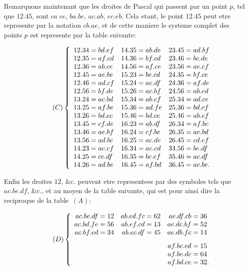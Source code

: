 \documentclass[11pt,a4paper]{book}
\begin{document}
\newpage
\setcounter{page}{552}

Remarquons maintenant que les droites de Pascal qui passent par un point $p$, tel que $12.45$, sont $ca\;ce$, $ba.be$, $ac.ab$, $ec.eb$. Cela etant, le point $12.45$ peut etre represente par la notation $cb.ae$, et de cette maniere le systeme complet des points $p$ est represente par la table suivante:

\begin{equation}
\tag{$C$}
\left\{
\begin{array}{r@{\;=\;}l r@{\;=\;}l r@{\;=\;}l}
12.34 & bd.ef & 14.35 & ab.de & 23.45 & ad.bf \\
12.35 & af.cd & 14.36 & bf.cd & 23.46 & bc.de \\
12.36 & ab.ce & 14.56 & af.ce & 23.56 & ae.cf \\
12.45 & ae.be & 15.23 & be.cd & 24.35 & bf.ce \\
12.46 & ad.cf & 15.24 & ae.df & 24.36 & af.de \\
12.56 & bf.de & 15.26 & ac.bf & 24.56 & ab.ed \\
13.24 & ac.bd & 15.34 & ab.cf & 25.34 & ad.ce \\
13.25 & af.be & 15.36 & ad.fe & 25.36 & bd.cf \\
13.26 & bd.ec & 15.46 & bd.ce & 25.46 & ab.ef \\
13.45 & cf.de & 16.23 & ab.df & 26.34 & af.bc \\
13.46 & ae.bf & 16.24 & cf.be & 26.35 & ae.bd \\
13.56 & ad.bc & 16.25 & ac.de & 26.45 & cd.ef \\
14.23 & ac.ef & 16.34 & ae.cd & 34.56 & be.df \\
14.25 & ce.df & 16.35 & bc.ef & 35.46 & ac.df \\
14.26 & ad.be & 16.45 & af.bd & 36.45 & ac.be.
\end{array}
\right.
\end{equation}

Enfin les droites $12$, \&c. peuvent etre representees par des symboles tels que $ac.be.df$, \&c., et au moyen de la table suivante, qui est pour ainsi dire la reciproque de la table~$(A)$:

\begin{equation}
\tag{$D$}
\left\{
\begin{array}{r@{\;=\;}l r@{\;=\;}l r@{\;=\;}l}
ac.be.df & 12 & ab.ed.fc & 62 & ae.df.cb & 36 \\
ac.bd.fe & 56 & ab.ef.cd & 13 & ae.dc.bf & 52 \\
ac.bf.ed & 34 & ab.ec.df & 45 & ae.db.fc & 14 \\[0.8em]
\multicolumn{2}{c}{} & \multicolumn{2}{c}{} & af.bc.ed & 15 \\
\multicolumn{2}{c}{} & \multicolumn{2}{c}{} & af.be.dc & 64 \\
\multicolumn{2}{c}{} & \multicolumn{2}{c}{} & af.bd.ce & 32.
\end{array}
\right.
\end{equation}
\end{document}
